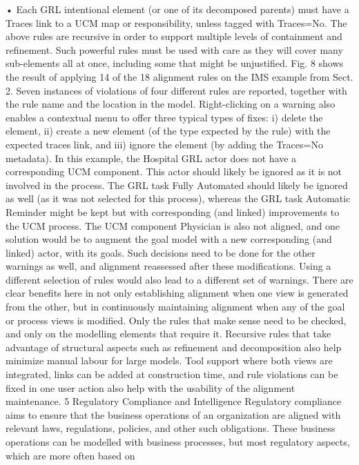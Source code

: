 • Each GRL intentional element (or one of its
decomposed parents) must have a Traces link
to a UCM map or responsibility, unless tagged
with Traces=No.
The above rules are recursive in order to support
multiple levels of containment and refinement.
Such powerful rules must be used with care as
they will cover many sub-elements all at once,
including some that might be unjustified.
Fig. 8 shows the result of applying 14 of the 18
alignment rules on the IMS example from Sect. 2.
Seven instances of violations of four different
rules are reported, together with the rule name
and the location in the model. Right-clicking on a
warning also enables a contextual menu to offer
three typical types of fixes: i) delete the element,
ii) create a new element (of the type expected
by the rule) with the expected traces link, and
iii) ignore the element (by adding the Traces=No
metadata).
In this example, the Hospital GRL actor does not
have a corresponding UCM component. This actor
should likely be ignored as it is not involved in the
process. The GRL task Fully Automated should
likely be ignored as well (as it was not selected
for this process), whereas the GRL task Automatic
Reminder might be kept but with corresponding
(and linked) improvements to the UCM process.
The UCM component Physician is also not aligned,
and one solution would be to augment the goal
model with a new corresponding (and linked)
actor, with its goals. Such decisions need to be
done for the other warnings as well, and alignment
reassessed after these modifications. Using a
different selection of rules would also lead to a
different set of warnings.
There are clear benefits here in not only establishing alignment when one view is generated
from the other, but in continuously maintaining
alignment when any of the goal or process views
is modified. Only the rules that make sense need
to be checked, and only on the modelling elements
that require it. Recursive rules that take advantage of structural aspects such as refinement and
decomposition also help minimize manual labour
for large models. Tool support where both views
are integrated, links can be added at construction
time, and rule violations can be fixed in one user
action also help with the usability of the alignment
maintenance.
5 Regulatory Compliance and Intelligence
Regulatory compliance aims to ensure that the
business operations of an organization are aligned
with relevant laws, regulations, policies, and other
such obligations. These business operations can
be modelled with business processes, but most
regulatory aspects, which are more often based on
